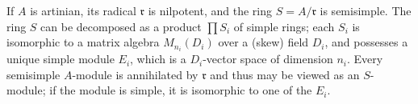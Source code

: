 If $A$ is artinian, its radical $\mathfrak{r}$ is nilpotent, and the ring $S = A/\mathfrak{r}$ is semisimple. The ring $S$ can be decomposed as a product $\prod S_i$ of simple rings; each $S_i$ is isomorphic to a matrix algebra $M_{n_i}(D_i)$ over a (skew) field $D_i$, and possesses a unique simple module $E_i$, which is a $D_i$-vector space of dimension $n_i$. Every semisimple $A$-module is annihilated by $\mathfrak{r}$ and thus may be viewed as an $S$-module; if the module is simple, it is isomorphic to one of the $E_i$.
